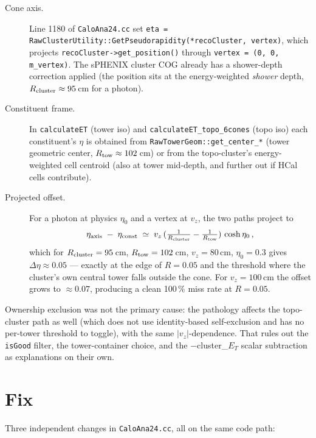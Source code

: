 \documentclass[11pt,a4paper]{article}
\newcommand{\branch}[1]{\texttt{\small #1}}
\begin{document}
\begin{description}
  \item[Cone axis.] Line 1180 of \branch{CaloAna24.cc} set
    \verb|eta = RawClusterUtility::GetPseudorapidity(*recoCluster, vertex)|,
    which projects \verb|recoCluster->get_position()| through
    \verb|vertex = (0, 0, m_vertex)|. The sPHENIX cluster COG already has a
    shower-depth correction applied (the position sits at the energy-weighted
    \emph{shower} depth, $R_{\rm cluster} \approx 95$\,cm for a photon).
  \item[Constituent frame.] In \verb|calculateET| (tower iso) and
    \verb|calculateET_topo_6cones| (topo iso) each constituent's $\eta$ is
    obtained from \verb|RawTowerGeom::get_center_*| (tower geometric center,
    $R_{\rm tow} \approx 102$\,cm) or from the topo-cluster's energy-weighted
    cell centroid (also at tower mid-depth, and further out if HCal cells
    contribute).
  \item[Projected offset.] For a photon at physics $\eta_0$ and a vertex at
    $v_z$, the two paths project to
    \[
      \eta_{\rm axis} \;-\; \eta_{\rm const}
      \;\simeq\; v_z \, (\tfrac{1}{R_{\rm cluster}} - \tfrac{1}{R_{\rm tow}})
      \,\cosh\eta_0
      \,,
    \]
    which for $R_{\rm cluster} = 95$\,cm, $R_{\rm tow} = 102$\,cm, $v_z = 80$\,cm,
    $\eta_0 = 0.3$ gives $\Delta\eta \approx 0.05$ --- exactly at the edge of
    $R = 0.05$ and the threshold where the cluster's own central tower falls
    outside the cone. For $v_z = 100$\,cm the offset grows to $\approx 0.07$,
    producing a clean 100\,\% miss rate at $R = 0.05$.
\end{description}

Ownership exclusion was not the primary cause: the pathology affects the
topo-cluster path as well (which does not use identity-based self-exclusion
and has no per-tower threshold to toggle), with the same $|v_z|$-dependence.
That rules out the \verb|isGood| filter, the tower-container choice, and
the $-$cluster\_$E_T$ scalar subtraction as explanations on their own.

\section{Fix}

Three independent changes in \branch{CaloAna24.cc}, all on the same code path:
\end{document}
